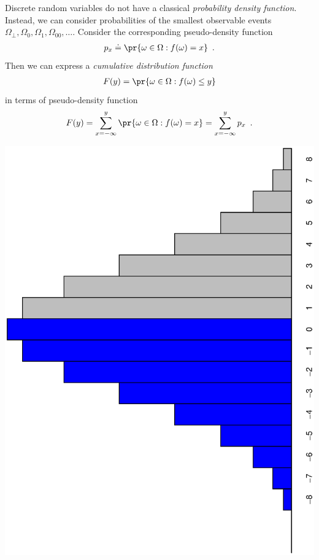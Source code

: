 \documentclass[landscape,footrule]{foils}
\begin{document}

Discrete random variables do not have a classical \emph{probability
  density function}. Instead, we can consider probabilities of the
smallest observable events
$\Omega_\bot,\Omega_0,\Omega_1,\Omega_{00},\ldots$.  Consider
the corresponding pseudo-density function
\begin{align*}
  p_x\doteq\pr{\omega\in\Omega: f(\omega)=x}\enspace.
\end{align*}
Then we can express a \emph{cumulative distribution function}
\begin{align*}
  F(y)=\pr{\omega\in\Omega: f(\omega)\leq y}
\end{align*}
in terms of pseudo-density function
\begin{align*}
  F(y)=\sum_{x=-\infty}^{y}\pr{\omega\in\Omega: f(\omega)=x}=\sum_{x=-\infty}^{y} p_x\enspace.
\end{align*}

\enlargethispage{3cm}

\centerline{\includegraphics[angle=-90,scale=0.7]{probability-distribution.eps}}
\vspace*{-\textheight}
\vspace*{1cm}\\
\end{document}

